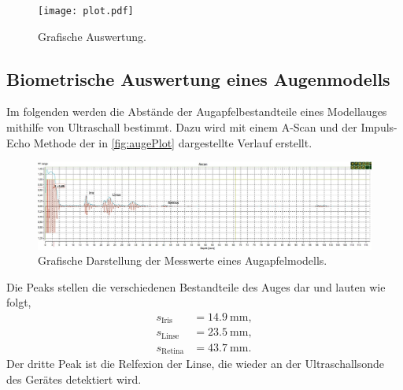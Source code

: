\begin{figure}[H]
  \centering
  \texttt{[image: plot.pdf]}
  \caption{Grafische Auswertung.}
  \label{fig:plot}
\end{figure}

\subsection{Biometrische Auswertung eines Augenmodells}
\label{subsec:auge}

Im folgenden werden die Abstände der Augapfelbestandteile eines Modellauges mithilfe von Ultraschall bestimmt. 
Dazu wird mit einem A-Scan und der Impuls-Echo Methode der in \autoref{fig:augePlot} dargestellte Verlauf erstellt.

\begin{figure}[H]
  \centering
  \includegraphics[width = \textwidth]{data/Auge.png}
  \caption{Grafische Darstellung der Messwerte eines Augapfelmodells.}
  \label{fig:augePlot}
\end{figure}

Die Peaks stellen die verschiedenen Bestandteile des Auges dar und lauten wie folgt,
\begin{align*}
  s_{\text{Iris}} &= \SI{14,9}{\mm}, \\
  s_{\text{Linse}} &= \SI{23,5}{\mm}, \\
  s_{\text{Retina}} &= \SI{43,7}{\mm}.
\end{align*}
Der dritte Peak ist die Relfexion der Linse, die wieder an der Ultraschallsonde des Gerätes detektiert wird.